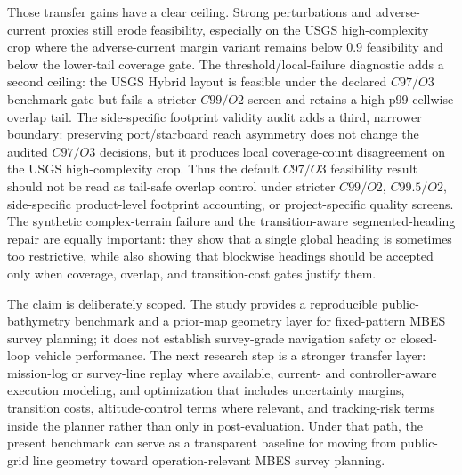 \documentclass[jmse,article,submit,moreauthors]{Definitions/mdpi}
\begin{document}
Those transfer gains have a clear ceiling. Strong perturbations and adverse-current proxies still erode feasibility, especially on the USGS high-complexity crop where the adverse-current margin variant remains below 0.9 feasibility and below the lower-tail coverage gate. The threshold/local-failure diagnostic adds a second ceiling: the USGS Hybrid layout is feasible under the declared \(C97/O3\) benchmark gate but fails a stricter \(C99/O2\) screen and retains a high p99 cellwise overlap tail. The side-specific footprint validity audit adds a third, narrower boundary: preserving port/starboard reach asymmetry does not change the audited \(C97/O3\) decisions, but it produces local coverage-count disagreement on the USGS high-complexity crop. Thus the default \(C97/O3\) feasibility result should not be read as tail-safe overlap control under stricter \(C99/O2\), \(C99.5/O2\), side-specific product-level footprint accounting, or project-specific quality screens. The synthetic complex-terrain failure and the transition-aware segmented-heading repair are equally important: they show that a single global heading is sometimes too restrictive, while also showing that blockwise headings should be accepted only when coverage, overlap, and transition-cost gates justify them.

The claim is deliberately scoped. The study provides a reproducible public-bathymetry benchmark and a prior-map geometry layer for fixed-pattern MBES survey planning; it does not establish survey-grade navigation safety or closed-loop vehicle performance. The next research step is a stronger transfer layer: mission-log or survey-line replay where available, current- and controller-aware execution modeling, and optimization that includes uncertainty margins, transition costs, altitude-control terms where relevant, and tracking-risk terms inside the planner rather than only in post-evaluation. Under that path, the present benchmark can serve as a transparent baseline for moving from public-grid line geometry toward operation-relevant MBES survey planning.

\vspace{6pt}

\end{document}
